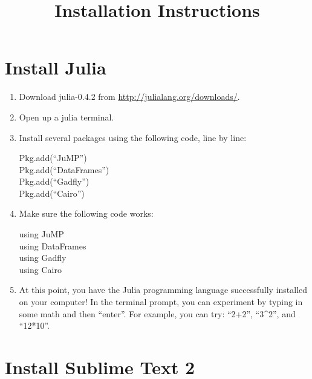 \documentclass[12pt]{article}
\begin{document}
\title{Installation Instructions}

\maketitle

\section{Install Julia}

\begin{enumerate}

\item Download julia-0.4.2 from \url{http://julialang.org/downloads/}. 

\item Open up a julia terminal.  

\item Install several packages using the following code, line by line:

Pkg.add(``JuMP'') \\
Pkg.add(``DataFrames'')\\
Pkg.add(``Gadfly'')\\
Pkg.add(``Cairo'')

\item Make sure the following code works:

using JuMP \\
using DataFrames \\
using Gadfly \\
using Cairo 

\item At this point, you have the Julia programming language successfully installed on your computer!  In the terminal prompt, you can experiment by typing in some math and then ``enter''.  For example, you can try: ``2+2'', ``3\string^2'', and ``12*10''.  
\end{enumerate}

\section{Install Sublime Text 2}
\end{document}
